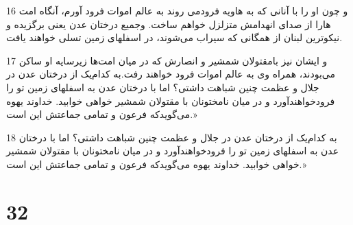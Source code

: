 \par 16 و چون او را با آنانی که به هاویه فرودمی روند به عالم اموات فرود آورم، آنگاه امت هارا از صدای انهدامش متزلزل خواهم ساخت. وجمیع درختان عدن یعنی برگزیده و نیکوترین لبنان از همگانی که سیراب می‌شوند، در اسفلهای زمین تسلی خواهند یافت.
\par 17 و ایشان نیز بامقتولان شمشیر و انصارش که در میان امت‌ها زیرسایه او ساکن می‌بودند، همراه وی به عالم اموات فرود خواهند رفت.به کدام‌یک از درختان عدن در جلال و عظمت چنین شباهت داشتی؟ اما با درختان عدن به اسفلهای زمین تو را فرودخواهند‌آورد و در میان نامختونان با مقتولان شمشیر خواهی خوابید. خداوند یهوه می‌گویدکه فرعون و تمامی جماعتش این است.»
\par 18 به کدام‌یک از درختان عدن در جلال و عظمت چنین شباهت داشتی؟ اما با درختان عدن به اسفلهای زمین تو را فرودخواهند‌آورد و در میان نامختونان با مقتولان شمشیر خواهی خوابید. خداوند یهوه می‌گویدکه فرعون و تمامی جماعتش این است.»

\chapter{32}

